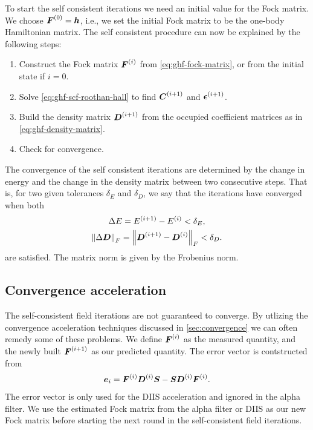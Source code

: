             To start the self consistent iterations we need an initial value for
            the Fock matrix.
            We choose $\boldsymbol{F}^{(0)} = \boldsymbol{h}$, i.e., we set the initial
            Fock matrix to be the one-body Hamiltonian matrix.
            The self consistent procedure can now be explained by the following
            steps:
            \begin{enumerate}
                \item Construct the Fock matrix $\boldsymbol{F}^{(i)}$ from
                    \autoref{eq:ghf-fock-matrix}, or from the initial state if
                    $i = 0$.
                \item Solve \autoref{eq:ghf-scf-roothan-hall} to find
                    $\boldsymbol{C}^{(i + 1)}$ and $\boldsymbol{\epsilon}^{(i + 1)}$.
                \item Build the density matrix $\boldsymbol{D}^{(i + 1)}$ from the
                    occupied coefficient matrices as in
                    \autoref{eq:ghf-density-matrix}.
                \item Check for convergence.
            \end{enumerate}
            The convergence of the self consistent iterations are determined by
            the change in energy and the change in the density matrix between
            two consecutive steps.
            That is, for two given tolerances $\delta_E$ and $\delta_D$, we say
            that the iterations have converged when both
            \begin{gather}
                \Delta E
                = E^{(i + 1)} - E^{(i)} < \delta_E,
                \\
                \norm{\Delta \boldsymbol{D}}_{F}
                = \norm{\boldsymbol{D}^{(i + 1)} - \boldsymbol{D}^{(i)}}_{F}
                < \delta_D.
            \end{gather}
            are satisfied.
            The matrix norm is given by the Frobenius norm.

        \subsection{Convergence acceleration}
            The self-consistent field iterations are not guaranteed to converge.
            By utlizing the convergence acceleration techniques discussed in
            \autoref{sec:convergence} we can often remedy some of these
            problems.
            We define $\boldsymbol{F}^{(i)}$ as the measured quantity, and the newly
            built $\boldsymbol{F}^{(i + 1)}$ as our predicted quantity.
            The error vector is contstructed from
            \begin{align}
                \boldsymbol{e}_i
                = \boldsymbol{F}^{(i)} \boldsymbol{D}^{(i)} \boldsymbol{S}
                - \boldsymbol{S} \boldsymbol{D}^{(i)} \boldsymbol{F}^{(i)}.
            \end{align}
            The error vector is only used for the DIIS acceleration and ignored
            in the alpha filter.
            We use the estimated Fock matrix from the alpha filter or DIIS as
            our new Fock matrix before starting the next round in the
            self-consistent field iterations.


